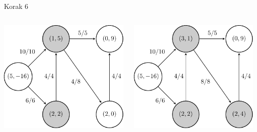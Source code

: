 \documentclass{beamer}
\begin{document}
\begin{frame}{Korak 6}
    \begin{columns}
        \begin{column}{0.5\textwidth}
            \centering
            \includegraphics[scale=0.7]{../writing/images/graf2-7.pdf}
        \end{column}
        \pause
        \begin{column}{0.5\textwidth}
            \centering
            \includegraphics[scale=0.7]{../writing/images/graf2-8.pdf}
        \end{column}
    \end{columns}
\end{frame}
\end{document}
